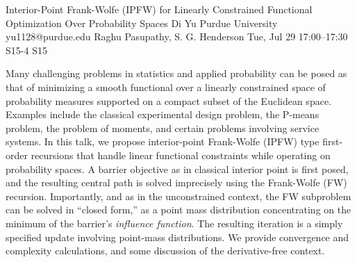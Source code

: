 \begin{talk}
  {Interior-Point Frank-Wolfe (IPFW) for Linearly Constrained Functional Optimization Over Probability Spaces}%
  {Di Yu}%
  {Purdue University}%
  {yu1128@purdue.edu}%
  {Raghu Pasupathy, S. G. Henderson}%
  {}%
  {Tue, Jul 29 17:00--17:30}%
  {S15-4}%
  {S15}%
  
    
   
Many challenging problems in statistics and applied probability can be posed as that of minimizing a smooth functional over a linearly constrained space of probability measures supported on a compact subset of the Euclidean space. Examples include the classical experimental design problem, the P-means problem, the problem of moments, and certain problems involving service systems.  In this talk, we propose interior-point Frank-Wolfe (IPFW) type first-order recursions that handle linear functional constraints while operating on probability spaces. A barrier objective as in classical interior point is first posed, and the resulting central path is solved imprecisely using the Frank-Wolfe (FW) recursion. Importantly, and as in the unconstrained context, the FW subproblem can be solved in ``closed form,'' as a point mass distribution concentrating on the minimum of the barrier's \emph{influence function}. The resulting iteration is a simply specified update involving point-mass distributions. We provide convergence and complexity calculations, and some discussion of the derivative-free context. 

\medskip




\end{talk}

